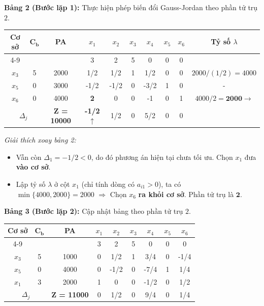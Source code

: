 \vspace{0.3cm}
\textbf{Bảng 2 (Bước lặp 1):} Thực hiện phép biến đổi Gauss-Jordan theo phần tử trụ $2$.
\begin{table}[H]
    \centering
    \renewcommand{\arraystretch}{1.3}
    \begin{tabular}{|c|c|c|c|c|c|c|c|c|c|}
        \hline
        \multirow{2}{*}{\textbf{Cơ sở}} & \multirow{2}{*}{$\mathbf{C_b}$} & \multirow{2}{*}{\textbf{PA}} & $x_1$ & $x_2$ & $x_3$ & $x_4$ & $x_5$ & $x_6$ & \multirow{2}{*}{\textbf{Tỷ số $\lambda$}} \\
        \cline{4-9}
        & & & 3 & 2 & 5 & 0 & 0 & 0 & \\
        \hline
        $x_3$ & 5 & 2000 & 1/2 & 1/2 & 1 & 1/2 & 0 & 0 & $2000 / (1/2) = 4000$ \\
        \hline
        $x_5$ & 0 & 3000 & -1/2 & -1/2 & 0 & -3/2 & 1 & 0 & - \\
        \hline
        $x_6$ & 0 & 4000 & \textbf{2} & 0 & 0 & -1 & 0 & 1 & $4000 / 2 = \mathbf{2000} \rightarrow$ \\
        \hline
        \multicolumn{2}{|c|}{$\Delta_j$} & \textbf{Z = 10000} & \textbf{-1/2} $\uparrow$ & 1/2 & 0 & 5/2 & 0 & 0 & \\
        \hline
    \end{tabular}
\end{table}
\textit{Giải thích xoay bảng 2:}
\begin{itemize}[itemsep=0pt, parsep=0pt, topsep=0pt]
    \item Vẫn còn $\Delta_1 = -1/2 < 0$, do đó phương án hiện tại chưa tối ưu. Chọn $x_1$ đưa \textbf{vào cơ sở}.
    \item Lập tỷ số $\lambda$ ở cột $x_1$ (chỉ tính dòng có $a_{i1} > 0$), ta có $\min\{4000, 2000\} = 2000$ $\Rightarrow$ Chọn $x_6$ \textbf{ra khỏi cơ sở}. Phần tử trụ là $\mathbf{2}$.
\end{itemize}

\vspace{0.3cm}
\textbf{Bảng 3 (Bước lặp 2):} Cập nhật bảng theo phần tử trụ $2$.
\begin{table}[H]
    \centering
    \renewcommand{\arraystretch}{1.3}
    \begin{tabular}{|c|c|c|c|c|c|c|c|c|}
        \hline
        \multirow{2}{*}{\textbf{Cơ sở}} & \multirow{2}{*}{$\mathbf{C_b}$} & \multirow{2}{*}{\textbf{PA}} & $x_1$ & $x_2$ & $x_3$ & $x_4$ & $x_5$ & $x_6$ \\
        \cline{4-9}
        & & & 3 & 2 & 5 & 0 & 0 & 0 \\
        \hline
        $x_3$ & 5 & 1000 & 0 & 1/2 & 1 & 3/4 & 0 & -1/4 \\
        \hline
        $x_5$ & 0 & 4000 & 0 & -1/2 & 0 & -7/4 & 1 & 1/4 \\
        \hline
        $x_1$ & 3 & 2000 & 1 & 0 & 0 & -1/2 & 0 & 1/2 \\
        \hline
        \multicolumn{2}{|c|}{$\Delta_j$} & \textbf{Z = 11000} & 0 & 1/2 & 0 & 9/4 & 0 & 1/4 \\
        \hline
    \end{tabular}
\end{table}

